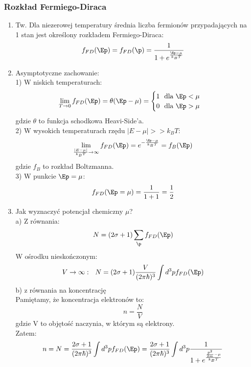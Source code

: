 \subsubsection{Rozkład Fermiego-Diraca}
\begin{enumerate}
\item Tw. Dla niezerowej temperatury średnia liczba fermionów przypadających na 1 stan jest określony rozkładem Fermiego-Diraca:
\begin{equation} f_{FD}(\Ep)=f_{FD}(\p)=\frac{1}{1+e^{\frac{\Ep-\mu}{k_BT}}}\end{equation}
\item Asymptotyczne zachowanie:\\
1) W niskich temperaturach:
\begin{equation}\lim\limits_{T \to 0}f_{FD}(\Ep)=\theta(\Ep-\mu)= \begin{cases} 1~~\text{dla}~\Ep < \mu \\ 0~~\text{dla}~\Ep >\mu\end{cases}\end{equation}
gdzie $\theta$ to funkcja schodkowa Heavi-Side'a.\\
2) W wysokich temperaturach rzędu $|E-\mu|>>k_BT$:
\begin{equation}\lim\limits_{\frac{|E-\mu|}{k_BT}\rightarrow\infty} f_{FD}(\Ep)=e^{-\frac{\Ep-\mu}{k_BT}}=f_B(\Ep)\end{equation}
gdzie $f_B$ to rozkład Boltzmanna.\\
3) W punkcie $\Ep=\mu$:
\begin{equation}f_{FD}(\Ep=\mu)=\frac{1}{1+1}=\frac{1}{2}\end{equation}
\item Jak wyznaczyć potencjał chemiczny $\mu$?\\
a) Z równania:
\begin{equation} N=(2\sigma+1)\sum_{\p}f_{FD}(\Ep)\end{equation}
W ośrodku nieskończonym:
\begin{equation}V\rightarrow\infty:~~N=(2\sigma+1)\frac{V}{(2\pi\hbar)^3}\int d^3p f_{FD}(\Ep)\end{equation}
b) z równania na koncentrację\\
Pamiętamy, że koncentracja elektronów to:
\begin{equation}n=\frac{N}{V}\end{equation}
gdzie V to objętość naczynia, w którym są elektrony.\\
Zatem:
\begin{equation}n=N=\frac{2\sigma+1}{(2\pi\hbar)^3}\int d^3p f_{FD}(\Ep)=\frac{2\sigma+1}{(2\pi\hbar)^3}\int d^3p \frac{1}{1+e^{\frac{\frac{p^2}{2m}-\mu}{k_BT}}}\end{equation}

\end{enumerate}
